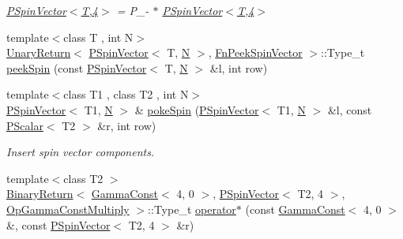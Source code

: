 \begin{DoxyCompactItemize}
\begin{DoxyCompactList}\small\item\em \mbox{\hyperlink{classENSEM_1_1PSpinVector_3_01T_00_014_01_4}{P\+Spin\+Vector$<$\+T,4$>$}} = P\+\_\+-\/ $\ast$ \mbox{\hyperlink{classENSEM_1_1PSpinVector_3_01T_00_014_01_4}{P\+Spin\+Vector$<$\+T,4$>$}} \end{DoxyCompactList}\item 
{\footnotesize template$<$class T , int N$>$ }\\\mbox{\hyperlink{structENSEM_1_1UnaryReturn}{Unary\+Return}}$<$ \mbox{\hyperlink{classENSEM_1_1PSpinVector}{P\+Spin\+Vector}}$<$ T, \mbox{\hyperlink{operator__name__util_8cc_a7722c8ecbb62d99aee7ce68b1752f337}{N}} $>$, \mbox{\hyperlink{structENSEM_1_1FnPeekSpinVector}{Fn\+Peek\+Spin\+Vector}} $>$\+::Type\+\_\+t \mbox{\hyperlink{group__primspinvector_gad13d4acbc90e4d69a8528585ad1c35c8}{peek\+Spin}} (const \mbox{\hyperlink{classENSEM_1_1PSpinVector}{P\+Spin\+Vector}}$<$ T, \mbox{\hyperlink{operator__name__util_8cc_a7722c8ecbb62d99aee7ce68b1752f337}{N}} $>$ \&l, int row)
\item 
{\footnotesize template$<$class T1 , class T2 , int N$>$ }\\\mbox{\hyperlink{classENSEM_1_1PSpinVector}{P\+Spin\+Vector}}$<$ T1, \mbox{\hyperlink{operator__name__util_8cc_a7722c8ecbb62d99aee7ce68b1752f337}{N}} $>$ \& \mbox{\hyperlink{group__primspinvector_ga55ef7594c5803a6f510d30a63e5aab4b}{poke\+Spin}} (\mbox{\hyperlink{classENSEM_1_1PSpinVector}{P\+Spin\+Vector}}$<$ T1, \mbox{\hyperlink{operator__name__util_8cc_a7722c8ecbb62d99aee7ce68b1752f337}{N}} $>$ \&l, const \mbox{\hyperlink{classENSEM_1_1PScalar}{P\+Scalar}}$<$ T2 $>$ \&r, int row)
\begin{DoxyCompactList}\small\item\em Insert spin vector components. \end{DoxyCompactList}\item 
{\footnotesize template$<$class T2 $>$ }\\\mbox{\hyperlink{structENSEM_1_1BinaryReturn}{Binary\+Return}}$<$ \mbox{\hyperlink{classENSEM_1_1GammaConst}{Gamma\+Const}}$<$ 4, 0 $>$, \mbox{\hyperlink{classENSEM_1_1PSpinVector}{P\+Spin\+Vector}}$<$ T2, 4 $>$, \mbox{\hyperlink{structENSEM_1_1OpGammaConstMultiply}{Op\+Gamma\+Const\+Multiply}} $>$\+::Type\+\_\+t \mbox{\hyperlink{group__primspinvector_ga78eeeb22b735ad934f6d55320f04be68}{operator$\ast$}} (const \mbox{\hyperlink{classENSEM_1_1GammaConst}{Gamma\+Const}}$<$ 4, 0 $>$ \&, const \mbox{\hyperlink{classENSEM_1_1PSpinVector}{P\+Spin\+Vector}}$<$ T2, 4 $>$ \&r)

\end{DoxyCompactItemize}
